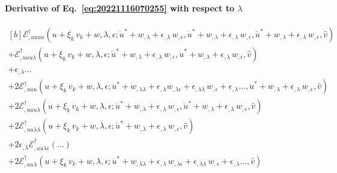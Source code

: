 \documentclass[12pt, final]{scrartcl}
\theoremstyle{definition}
\newcommand{\EE}{\mathcal E ^ \dagger}
\begin{document}
\paragraph{Derivative of Eq.~\eqref{eq:20221116070255} with respect to \(\lambda\)}
\begin{equation}
  \begin{aligned}[b]
    \EE_{,uuuu}(u + \xi_k \, v_k + w, \lambda, \epsilon; \dot{u}^\ast + w_{,\lambda} + \epsilon_{,\lambda} \, w_{,\epsilon}, \dot{u}^\ast + w_{,\lambda} + \epsilon_{,\lambda} \, w_{,\epsilon}, \dot{u}^\ast + w_{,\lambda} + \epsilon_{,\lambda} \, w_{,\epsilon}, \hat{v}) &\\
    + \EE_{,uuu\lambda}(u + \xi_k \, v_k + w, \lambda, \epsilon; \dot{u}^\ast + w_{,\lambda} + \epsilon_{,\lambda} \, w_{,\epsilon}, \dot{u}^\ast + w_{,\lambda} + \epsilon_{,\lambda} \, w_{,\epsilon}, \hat{v}) &\\
    + \epsilon_{,\lambda} \ldots &\\
    + 2\EE_{,uuu}(u + \xi_k \, v_k + w, \lambda, \epsilon; \ddot{u}^\ast + w_{,\lambda\lambda} + \epsilon_{,\lambda} w_{,\lambda\epsilon} + \epsilon_{,\lambda\lambda} \, w_{,\epsilon} + \epsilon_{,\lambda} \ldots, \dot{u}^\ast + w_{,\lambda} + \epsilon_{,\lambda} \, w_{,\epsilon}, \hat{v}) &\\
    + 2\EE_{,uuu\lambda}(u + \xi_k \, v_k + w, \lambda, \epsilon; \dot{u}^\ast + w_{,\lambda} + \epsilon_{,\lambda} \, w_{,\epsilon}, \dot{u}^\ast + w_{,\lambda} + \epsilon_{,\lambda} \, w_{,\epsilon}, \hat{v}) &\\
    + 2\EE_{,uu\lambda\lambda}(u + \xi_k \, v_k + w, \lambda, \epsilon; \dot{u}^\ast + w_{,\lambda} + \epsilon_{,\lambda} \, w_{,\epsilon}, \hat{v}) &\\
    + 2\epsilon_{,\lambda} \EE_{,uu\lambda\epsilon}(\ldots) &\\
     + 2\EE_{,uu\lambda}(u + \xi_k \, v_k + w, \lambda, \epsilon; \ddot{u}^\ast + w_{,\lambda\lambda} + \epsilon_{,\lambda} \, w_{,\lambda\epsilon} + \epsilon_{,\lambda\lambda} \, w_{,\epsilon} + \epsilon_{,\lambda} \ldots, \hat{v}) &\\

\end{aligned}
\end{equation}
\end{document}

